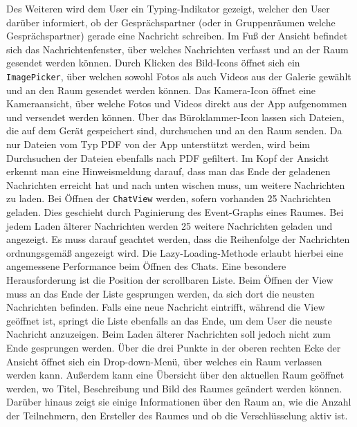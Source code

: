     Des Weiteren wird dem User ein Typing-Indikator gezeigt, welcher den User darüber informiert, ob der Gesprächspartner (oder in Gruppenräumen welche Gesprächspartner) gerade eine Nachricht schreiben.
    Im Fuß der Ansicht befindet sich das Nachrichtenfenster, über welches Nachrichten verfasst und an der Raum gesendet werden können.
    Durch Klicken des Bild-Icons öffnet sich ein \texttt{ImagePicker}, über welchen sowohl Fotos als auch Videos aus der Galerie gewählt und an den Raum gesendet werden können.
    Das Kamera-Icon öffnet eine Kameraansicht, über welche Fotos und Videos direkt aus der App aufgenommen und versendet werden können.
    Über das Büroklammer-Icon lassen sich Dateien, die auf dem Gerät gespeichert sind, durchsuchen und an den Raum senden.
    Da nur Dateien vom Typ PDF von der App unterstützt werden, wird beim Durchsuchen der Dateien ebenfalls nach PDF gefiltert.
    Im Kopf der Ansicht erkennt man eine Hinweismeldung darauf, dass man das Ende der geladenen Nachrichten erreicht hat und nach unten wischen muss, um weitere Nachrichten zu laden.
    Bei Öffnen der \texttt{ChatView} werden, sofern vorhanden 25 Nachrichten geladen.
    Dies geschieht durch Paginierung des Event-Graphs eines Raumes.
    Bei jedem Laden älterer Nachrichten werden 25 weitere Nachrichten geladen und angezeigt.
    Es muss darauf geachtet werden, dass die Reihenfolge der Nachrichten ordnungsgemäß angezeigt wird.
    Die Lazy-Loading-Methode erlaubt hierbei eine angemessene Performance beim Öffnen des Chats.
    Eine besondere Herausforderung ist die Position der scrollbaren Liste.
    Beim Öffnen der View muss an das Ende der Liste gesprungen werden, da sich dort die neusten Nachrichten befinden.
    Falls eine neue Nachricht eintrifft, während die View geöffnet ist, springt die Liste ebenfalls an das Ende, um dem User die neuste Nachricht anzuzeigen.
    Beim Laden älterer Nachrichten soll jedoch nicht zum Ende gesprungen werden.
    Über die drei Punkte in der oberen rechten Ecke der Ansicht öffnet sich ein Drop-down-Menü, über welches ein Raum verlassen werden kann.
    Außerdem kann eine Übersicht über den aktuellen Raum geöffnet werden, wo Titel, Beschreibung und Bild des Raumes geändert werden können.
    Darüber hinaus zeigt sie einige Informationen über den Raum an, wie die Anzahl der Teilnehmern, den Ersteller des Raumes und ob die Verschlüsselung aktiv ist.

    \newpage
